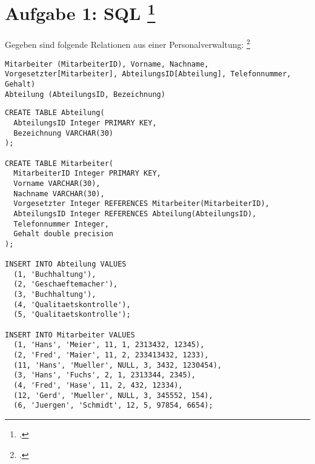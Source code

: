 \documentclass{lehramt-informatik-aufgabe}
\begin{document}

\section{Aufgabe 1: SQL
\footcite[Thema 1 Teilaufgabe 1 Aufgabe 4]{examen:66116:2016:09}}

Gegeben sind folgende Relationen aus einer Personalverwaltung:
\footcite{db:pu:3}

\begin{verbatim}
Mitarbeiter (MitarbeiterID), Vorname, Nachname, Vorgesetzter[Mitarbeiter], AbteilungsID[Abteilung], Telefonnummer, Gehalt)
Abteilung (AbteilungsID, Bezeichnung)
\end{verbatim}

\begin{verbatim}
CREATE TABLE Abteilung(
  AbteilungsID Integer PRIMARY KEY,
  Bezeichnung VARCHAR(30)
);

CREATE TABLE Mitarbeiter(
  MitarbeiterID Integer PRIMARY KEY,
  Vorname VARCHAR(30),
  Nachname VARCHAR(30),
  Vorgesetzter Integer REFERENCES Mitarbeiter(MitarbeiterID),
  AbteilungsID Integer REFERENCES Abteilung(AbteilungsID),
  Telefonnummer Integer,
  Gehalt double precision
);

INSERT INTO Abteilung VALUES
  (1, 'Buchhaltung'),
  (2, 'Geschaeftemacher'),
  (3, 'Buchhaltung'),
  (4, 'Qualitaetskontrolle'),
  (5, 'Qualitaetskontrolle');

INSERT INTO Mitarbeiter VALUES
  (1, 'Hans', 'Meier', 11, 1, 2313432, 12345),
  (2, 'Fred', 'Maier', 11, 2, 233413432, 1233),
  (11, 'Hans', 'Mueller', NULL, 3, 3432, 1230454),
  (3, 'Hans', 'Fuchs', 2, 1, 2313344, 2345),
  (4, 'Fred', 'Hase', 11, 2, 432, 12334),
  (12, 'Gerd', 'Mueller', NULL, 3, 345552, 154),
  (6, 'Juergen', 'Schmidt', 12, 5, 97854, 6654);
\end{verbatim}
\end{document}
